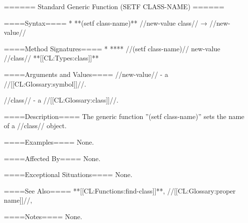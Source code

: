 ====== Standard Generic Function (SETF CLASS-NAME) ======

====Syntax====
  * **(setf class-name)** //new-value class// → //new-value//

====Method Signatures====
  * **** //(setf class-name)// {new-value //class// **[[CL:Types:class]]**}

====Arguments and Values====
//new-value// - a //[[CL:Glossary:symbol]]//.

//class// - a //[[CL:Glossary:class]]//.

====Description====
The generic function ''(setf class-name)'' sets the name of a //class// object.

====Examples====
None.

====Affected By====
None.

====Exceptional Situations====
None.

====See Also====
**[[CL:Functions:find-class]]**, //[[CL:Glossary:proper name]]//, {\secref\Classes}

====Notes====
None.


